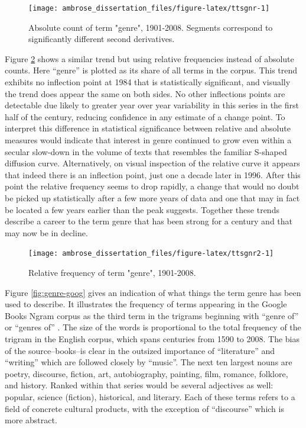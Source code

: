 \documentclass[]{book}
\theoremstyle{definition}
\theoremstyle{definition}
\theoremstyle{definition}
\theoremstyle{remark}
\begin{document}
\begin{figure}

{\centering \texttt{[image: ambrose\_dissertation\_files/figure-latex/ttsgnr-1]} 

}

\caption{Absolute count of term "genre", 1901-2008. Segments correspond to significantly different second derivatives.}\label{fig:ttsgnr}
\end{figure}

Figure \ref{fig:ttsgnr2} shows a similar trend but using relative
frequencies instead of absolute counts. Here ``genre'' is plotted as its
share of all terms in the corpus. This trend exhibits no inflection
point at 1984 that is statistically significant, and visually the trend
does appear the same on both sides. No other inflections points are
detectable due likely to greater year over year variability in this
series in the first half of the century, reducing confidence in any
estimate of a change point. To interpret this difference in statistical
significance between relative and absolute measures would indicate that
interest in genre continued to grow even within a secular slow-down in
the volume of texts that resembles the familiar S-shaped diffusion
curve. Alternatively, on visual inspection of the relative curve it
appears that indeed there is an inflection point, just one a decade
later in 1996. After this point the relative frequency seems to drop
rapidly, a change that would no doubt be picked up statistically after a
few more years of data and one that may in fact be located a few years
earlier than the peak suggests. Together these trends describe a career
to the term genre that has been strong for a century and that may now be
in decline.

\begin{figure}

{\centering \texttt{[image: ambrose\_dissertation\_files/figure-latex/ttsgnr2-1]} 

}

\caption{Relative frequency of term "genre", 1901-2008.}\label{fig:ttsgnr2}
\end{figure}

Figure \ref{fig:genre-goog} gives an indication of what things the term
genre has been used to describe. It illustrates the frequency of terms
appearing in the Google Books Ngram corpus as the third term in the
trigrams beginning with ``genre of'' or ``genres of''
\citep{2012Google}. The size of the words is proportional to the total
frequency of the trigram in the English corpus, which spans centuries
from 1590 to 2008. The bias of the source--books--is clear in the
outsized importance of ``literature'' and ``writing'' which are followed
closely by ``music''. The next ten largest nouns are poetry, discourse,
fiction, art, autobiography, painting, film, romance, folklore, and
history. Ranked within that series would be several adjectives as well:
popular, science (fiction), historical, and literary. Each of these
terms refers to a field of concrete cultural products, with the
exception of ``discourse'' which is more abstract.
\end{document}
